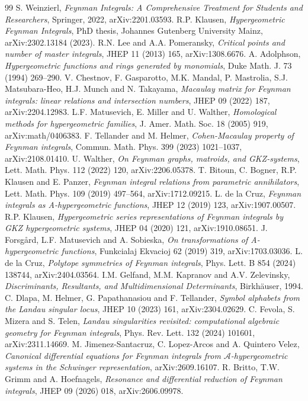 \documentclass[11pt,a4paper]{article}
\begin{document}
\begin{thebibliography}{99}
 S. Weinzierl, \emph{Feynman Integrals: A Comprehensive Treatment for Students and Researchers}, Springer, 2022, arXiv:2201.03593.
 R.P. Klausen, \emph{Hypergeometric Feynman Integrals}, PhD thesis, Johannes Gutenberg University Mainz, arXiv:2302.13184 (2023).
 R.N. Lee and A.A. Pomeransky, \emph{Critical points and number of master integrals}, JHEP 11 (2013) 165, arXiv:1308.6676.
 A. Adolphson, \emph{Hypergeometric functions and rings generated by monomials}, Duke Math. J. 73 (1994) 269--290.
 V. Chestnov, F. Gasparotto, M.K. Mandal, P. Mastrolia, S.J. Matsubara-Heo, H.J. Munch and N. Takayama, \emph{Macaulay matrix for Feynman integrals: linear relations and intersection numbers}, JHEP 09 (2022) 187, arXiv:2204.12983.
 L.F. Matusevich, E. Miller and U. Walther, \emph{Homological methods for hypergeometric families}, J. Amer. Math. Soc. 18 (2005) 919, arXiv:math/0406383.
 F. Tellander and M. Helmer, \emph{Cohen-Macaulay property of Feynman integrals}, Commun. Math. Phys. 399 (2023) 1021--1037, arXiv:2108.01410.
 U. Walther, \emph{On Feynman graphs, matroids, and GKZ-systems}, Lett. Math. Phys. 112 (2022) 120, arXiv:2206.05378.
 T. Bitoun, C. Bogner, R.P. Klausen and E. Panzer, \emph{Feynman integral relations from parametric annihilators}, Lett. Math. Phys. 109 (2019) 497--564, arXiv:1712.09215.
 L. de la Cruz, \emph{Feynman integrals as A-hypergeometric functions}, JHEP 12 (2019) 123, arXiv:1907.00507.
 R.P. Klausen, \emph{Hypergeometric series representations of Feynman integrals by GKZ hypergeometric systems}, JHEP 04 (2020) 121, arXiv:1910.08651.
 J. Forsg\aa rd, L.F. Matusevich and A. Sobieska, \emph{On transformations of A-hypergeometric functions}, Funkcialaj Ekvacioj 62 (2019) 319, arXiv:1703.03036.
 L. de la Cruz, \emph{Polytope symmetries of Feynman integrals}, Phys. Lett. B 854 (2024) 138744, arXiv:2404.03564.
 I.M. Gelfand, M.M. Kapranov and A.V. Zelevinsky, \emph{Discriminants, Resultants, and Multidimensional Determinants}, Birkh\"auser, 1994.
 C. Dlapa, M. Helmer, G. Papathanasiou and F. Tellander, \emph{Symbol alphabets from the Landau singular locus}, JHEP 10 (2023) 161, arXiv:2304.02629.
 C. Fevola, S. Mizera and S. Telen, \emph{Landau singularities revisited: computational algebraic geometry for Feynman integrals}, Phys. Rev. Lett. 132 (2024) 101601, arXiv:2311.14669.
 M. Jimenez-Santacruz, C. Lopez-Arcos and A. Quintero Velez, \emph{Canonical differential equations for Feynman integrals from $\mathcal{A}$-hypergeometric systems in the Schwinger representation}, arXiv:2609.16107.
 R. Britto, T.W. Grimm and A. Hoefnagels, \emph{Resonance and differential reduction of Feynman integrals}, JHEP 09 (2026) 018, arXiv:2606.09978.
\end{thebibliography}
\end{document}
